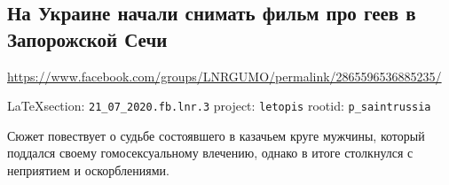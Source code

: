  
 

\subsection{На Украине начали снимать фильм про геев в Запорожской Сечи}
\url{https://www.facebook.com/groups/LNRGUMO/permalink/2865596536885235/}
  
\vspace{0.5cm}
{\small\LaTeX section: \verb|21_07_2020.fb.lnr.3| project: \verb|letopis| rootid: \verb|p_saintrussia|}
\vspace{0.5cm}

Сюжет повествует о судьбе состоявшего в казачьем круге мужчины, который
поддался своему гомосексуальному влечению, однако в итоге столкнулся с
неприятием и оскорблениями.
